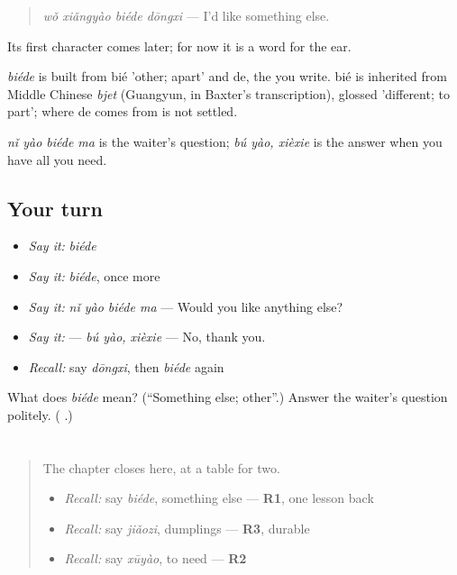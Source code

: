 \begin{quote}
\emph{wǒ xiǎngyào biéde dōngxi} — I'd like something else.
\end{quote}

Its first character comes later; for now it is a word for the ear.

\begin{cousinweb}
\emph{biéde} is built from bié 'other; apart' and de, the  you write. bié is inherited from Middle Chinese \emph{bjet} (Guangyun, in Baxter's transcription), glossed 'different; to part'; where de comes from is not settled.
\end{cousinweb}

\begin{grammarlens}[title={What you've built}]
\emph{nǐ yào biéde ma} is the waiter's question; \emph{bú yào, xièxie} is the answer when you have all you need.
\end{grammarlens}

\subsection*{Your turn}
\begin{itemize}
\raggedright
  \item \emph{Say it:} \emph{biéde}
  \item \emph{Say it:} \emph{biéde}, once more
  \item \emph{Say it:} \emph{nǐ yào biéde ma} — Would you like anything else?
  \item \emph{Say it:}   — \emph{bú yào, xièxie} — No, thank you.
  \item \emph{Recall:} say \emph{dōngxi}, then \emph{biéde} again
\end{itemize}

\begin{tcolorbox}[breakable,colback=teal!4,colframe=teal!35!black,title={Before you move on}]
What does \emph{biéde} mean? (\textquotedblleft{}Something else; other\textquotedblright{}.) Answer the waiter's question politely. (\textbf{ }.)
\end{tcolorbox}
\section[Practice]{}

\label{lesson:ZH-C92-practice}



\begin{quote}
The chapter closes here, at a table for two.

\begin{itemize}
\raggedright
  \item \emph{Recall:} say \emph{biéde}, something else — \textbf{R1}, one lesson back
  \item \emph{Recall:} say \emph{jiǎozi}, dumplings — \textbf{R3}, durable
  \item \emph{Recall:} say \emph{xūyào}, to need — \textbf{R2}
\end{itemize}
\end{quote}

